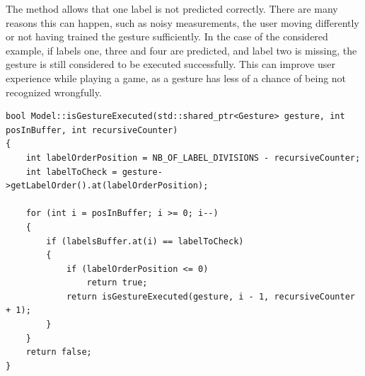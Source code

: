 The method allows that one label is not predicted correctly. There are many reasons this can happen, such as noisy measurements, the user moving differently or not having trained the gesture sufficiently. In the case of the considered example, if labels one, three and four are predicted, and label two is missing, the gesture is still considered to be executed successfully. This can improve user experience while playing a game, as a gesture has less of a chance of being not recognized wrongfully.\\

\begin{lstlisting}[caption=method to verify if a gesture with given label is executed, label=code_gesture_executed]
bool Model::isGestureExecuted(std::shared_ptr<Gesture> gesture, int posInBuffer, int recursiveCounter)
{
	int labelOrderPosition = NB_OF_LABEL_DIVISIONS - recursiveCounter;
	int labelToCheck = gesture->getLabelOrder().at(labelOrderPosition);

	for (int i = posInBuffer; i >= 0; i--)
	{
		if (labelsBuffer.at(i) == labelToCheck)
		{
			if (labelOrderPosition <= 0)
				return true;
			return isGestureExecuted(gesture, i - 1, recursiveCounter + 1);
		}
	}
	return false;
}
\end{lstlisting}